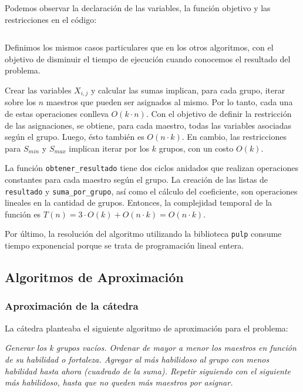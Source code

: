 \documentclass{article}
\begin{document}
Podemos observar la declaración de las variables, la función objetivo y las restricciones en el código:

\inputminted[linenos, firstline=4, lastline=66]{python}{codigo/programacion_lineal.py}

Definimos los mismos casos particulares que en los otros algoritmos, con el objetivo de disminuir el tiempo de ejecución cuando conocemos el resultado del problema.

Crear las variables $X_{i,j}$ y calcular las sumas implican, para cada grupo, iterar sobre los $n$ maestros que pueden ser asignados al mismo. Por lo tanto, cada una de estas operaciones conlleva $O(k \cdot n)$. Con el objetivo de definir la restricción de las asignaciones, se obtiene, para cada maestro, todas las variables asociadas según el grupo. Luego, ésto también es $O(n \cdot k)$. En cambio, las restricciones para $S_{min}$ y $S_{max}$ implican iterar por los $k$ grupos, con un costo $O(k)$. 

La función \texttt{obtener\_resultado} tiene dos ciclos anidados que realizan operaciones constantes para cada maestro según el grupo. La creación de las listas de \texttt{resultado} y \texttt{suma\_por\_grupo}, así como el cálculo del coeficiente, son operaciones lineales en la cantidad de grupos. Entonces, la complejidad temporal de la función es $T(n) = 3 \cdot O(k) + O(n \cdot k) = O(n \cdot k)$.

Por último, la resolución del algoritmo utilizando la biblioteca \texttt{pulp} consume tiempo exponencial porque se trata de programación lineal entera.

\subsection{Algoritmos de Aproximación}
\subsubsection{Aproximación de la cátedra}
\label{sec:algoAproxCatedra}

La cátedra planteaba el siguiente algoritmo de aproximación para el problema:

\textit{Generar los k grupos vacíos. Ordenar de mayor a menor los maestros en función de su habilidad o fortaleza. Agregar al más habilidoso al grupo con menos habilidad hasta ahora (cuadrado de la suma). Repetir siguiendo con el siguiente más habilidoso, hasta que no queden más maestros por asignar.}
\end{document}
